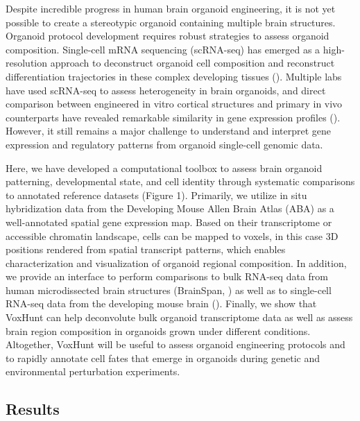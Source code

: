 Despite incredible progress in human brain organoid engineering, it is not yet possible to create a stereotypic organoid containing multiple brain structures.
Organoid protocol development requires robust strategies to assess organoid composition. Single-cell mRNA sequencing (scRNA-seq) has emerged as a high-resolution approach to deconstruct organoid cell composition and reconstruct differentiation trajectories in these complex developing tissues (\cite{camp_human_2015,kanton_organoid_2019,quadrato_cell_2017,velasco_individual_2019}). Multiple labs have used scRNA-seq to assess heterogeneity in brain organoids, and direct comparison between engineered in vitro cortical structures and primary in vivo counterparts have revealed remarkable similarity in gene expression profiles (\cite{camp_human_2015,pollen_establishing_2019}). However, it still remains a major challenge to understand and interpret gene expression and regulatory patterns from organoid single-cell genomic data. 

Here, we have developed a computational toolbox to assess brain organoid patterning, developmental state, and cell identity through systematic comparisons to annotated reference datasets (Figure 1). Primarily, we utilize in situ hybridization data from the Developing Mouse Allen Brain Atlas (ABA) as a well-annotated spatial gene expression map. Based on their transcriptome or accessible chromatin landscape, cells can be mapped to voxels, in this case 3D positions rendered from spatial transcript patterns, which enables characterization and visualization of organoid regional composition. In addition, we provide an interface to perform comparisons to bulk RNA-seq data from human microdissected brain structures (BrainSpan, \cite{thompson_high-resolution_2014}) as well as to single-cell RNA-seq data from the developing mouse brain (\cite{la_manno_molecular_2021}). Finally, we show that VoxHunt can help deconvolute bulk organoid transcriptome data as well as assess brain region composition in organoids grown under different conditions. Altogether, VoxHunt will be useful to assess organoid engineering protocols and to rapidly annotate cell fates that emerge in organoids during genetic and environmental perturbation experiments.


\subsection{Results}


